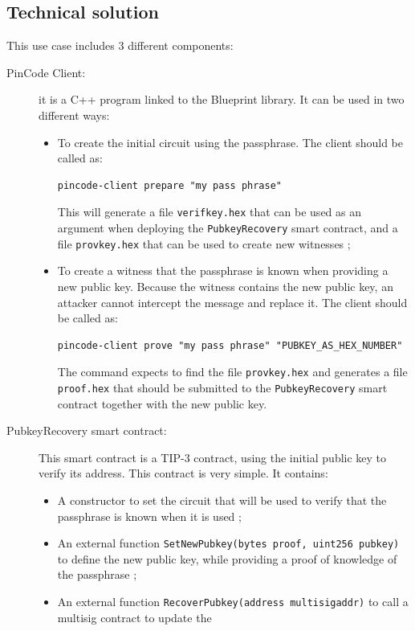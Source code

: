 \documentclass[10pt,a4paper]{article}
\begin{document}
\subsection{Technical solution}

This use case includes 3 different components:
\begin{description}
\item[PinCode Client:] it is a C++ program linked to the Blueprint
  \zksnarks{} library. It can be used in two different ways:
  \begin{itemize}
  \item To create the initial circuit using the passphrase. The client
    should be called as:
\begin{verbatim}
pincode-client prepare "my pass phrase"
\end{verbatim}
   This will generate a file \lstinline{verifkey.hex} that can be used
   as an argument when deploying the \lstinline{PubkeyRecovery} smart
   contract, and a file \lstinline{provkey.hex} that can be used to
   create new witnesses ;
 \item To create a witness that the passphrase is known when providing
   a new public key. Because the witness contains the new public key,
   an attacker cannot intercept the message and replace it. The client
   should be called as:
\begin{verbatim}
pincode-client prove "my pass phrase" "PUBKEY_AS_HEX_NUMBER"
\end{verbatim}
  The command expects to find the file \lstinline{provkey.hex} and
  generates a file \lstinline{proof.hex} that should be submitted to
  the \lstinline{PubkeyRecovery} smart contract together with the new
  public key.
  \end{itemize}
\item[PubkeyRecovery smart contract:] This smart contract is a TIP-3
  contract, using the initial public key to verify its address. This
  contract is very simple. It contains:
  \begin{itemize}
  \item A constructor to set the circuit that will be used to verify
    that the passphrase is known when it is used ;
  \item An external function
    \lstinline{SetNewPubkey(bytes proof, uint256 pubkey)}
    to define the new public key, while providing a
    proof of knowledge of the passphrase ;
  \item An external function
    \lstinline{RecoverPubkey(address multisigaddr)}
    to call a multisig contract to update the

\end{itemize}
\end{description}
\end{document}
